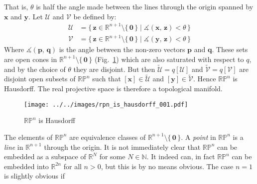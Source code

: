 \documentclass{article}
\theoremstyle{plain}
\theoremstyle{normal}
\newenvironment{example}{%
    \pushQED{\qed}\renewcommand{\qedsymbol}{$\blacksquare$}\examplex%
}{%
    \popQED\endexamplex%
}
\begin{document}
\begin{example}[\textbf{Real Projective Space}]
            That is, $\theta$ is half the angle made between the lines through
            the origin spanned by $\mathbf{x}$ and $\mathbf{y}$. Let
            $\mathcal{U}$ and $\mathcal{V}$ be defined by:
            \begin{align}
                \mathcal{U}
                &=\big\{\,
                    \mathbf{z}\in\mathbb{R}^{n+1}\setminus\{\,\mathbf{0}\,\}
                        \;|\;\measuredangle(\mathbf{x},\,\mathbf{z})<\theta\,
                    \big\}\\
                \mathcal{V}
                &=\big\{\,
                    \mathbf{z}\in\mathbb{R}^{n+1}\setminus\{\,\mathbf{0}\,\}
                        \;|\;\measuredangle(\mathbf{y},\,\mathbf{z})<\theta\,
                    \big\}
            \end{align}
            Where $\measuredangle(\mathbf{p},\,\mathbf{q})$ is the angle
            between the non-zero vectors $\mathbf{p}$ and $\mathbf{q}$. These
            sets are open cones in
            $\mathbb{R}^{n+1}\setminus\{\,\mathbf{0}\,\}$
            (Fig.~\ref{fig:rpn_is_hausdorff_001}) which are also
            saturated with respect to $q$, and by the choice of $\theta$ they
            are disjoint. But then $\tilde{\mathcal{U}}=q[\mathcal{U}]$ and
            $\tilde{\mathcal{V}}=q[\mathcal{V}]$ are disjoint open subsets of
            $\mathbb{RP}^{n}$ such that
            $[\mathbf{x}]\in\tilde{\mathcal{U}}$ and
            $[\mathbf{y}]\in\tilde{\mathcal{V}}$. Hence $\mathbb{RP}^{n}$ is
            Hausdorff. The real projective space is therefore a topological
            manifold.
        \end{example}
        \begin{figure}
            \centering
            \texttt{[image: ../../images/rpn\_is\_hausdorff\_001.pdf]}
            \caption{$\mathbb{RP}^{n}$ is Hausdorff}
            \label{fig:rpn_is_hausdorff_001}
        \end{figure}
        The elements of $\mathbb{RP}^{n}$ are equivalence classes of
        $\mathbb{R}^{n+1}\setminus\{\,\mathbf{0}\,\}$. A
        \textit{point} in $\mathbb{RP}^{n}$ is a \textit{line} in
        $\mathbb{R}^{n+1}$ through the origin. It is not immediately clear that
        $\mathbb{RP}^{n}$ can be embedded as a subspace of $\mathbb{R}^{N}$ for
        some $N\in\mathbb{N}$. It indeed can, in fact
        $\mathbb{RP}^{n}$ can be embedded into $\mathbb{R}^{2n}$ for all $n>0$,
        but this is by no means obvious. The case $n=1$ is slightly obvious if
\end{document}
